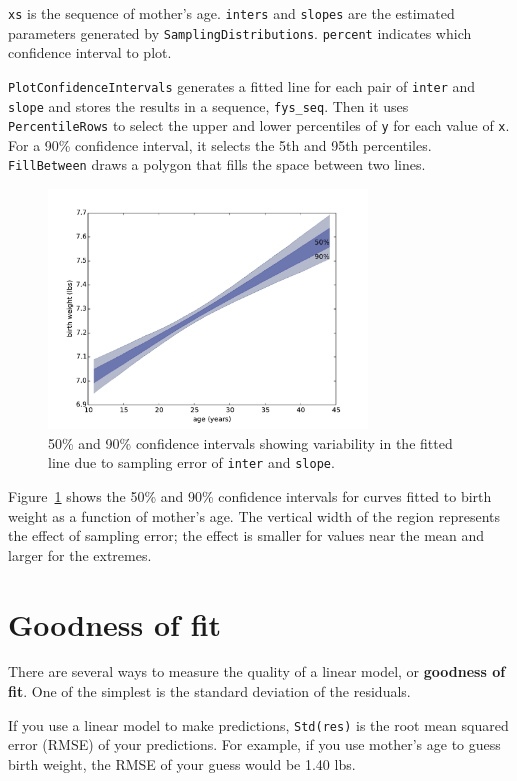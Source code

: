 \documentclass[12pt]{book}
\begin{document}
{\tt xs} is the sequence of mother's age.  {\tt inters} and {\tt slopes}
are the estimated parameters generated by {\tt SamplingDistributions}.
{\tt percent} indicates which confidence interval to plot.

{\tt PlotConfidenceIntervals} generates a fitted line for each pair
of {\tt inter} and {\tt slope} and stores the results in a sequence,
\verb"fys_seq".  Then it uses {\tt PercentileRows} to select the
upper and lower percentiles of {\tt y} for each value of {\tt x}.
For a 90\% confidence interval, it selects the 5th and 95th percentiles.
{\tt FillBetween} draws a polygon that fills the space between two
lines.

\begin{figure}
\centerline{\includegraphics[height=2.5in]{figs/linear3.pdf}}
\caption{50\% and 90\% confidence intervals showing variability in the
  fitted line due to sampling error of {\tt inter} and {\tt slope}.}
\label{linear3}
\end{figure}

Figure~\ref{linear3} shows the 50\% and 90\% confidence
intervals for curves fitted to birth weight as a function of
mother's age.
  The vertical width of the region represents the effect of
sampling error; the effect is smaller for values near the mean and
larger for the extremes.


\section{Goodness of fit}
\label{goodness}

There are several ways to measure the quality of a linear model, or
{\bf goodness of fit}.  One of the simplest is the standard deviation
of the residuals.

If you use a linear model to make predictions, {\tt Std(res)}
is the root mean squared error (RMSE) of your predictions.  For
example, if you use mother's age to guess birth weight, the RMSE of
your guess would be 1.40 lbs.
\end{document}
